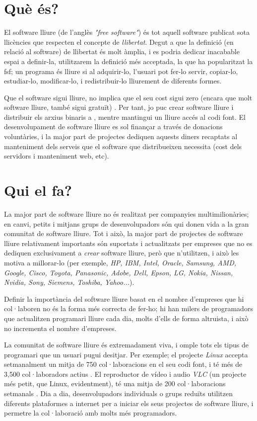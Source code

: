 \section{Què és?}

El software lliure (de l'anglès \emph{"free software"}) és tot aquell software publicat
sota llicències que respecten el concepte de \emph{llibertat}. Degut a que la definició
(en relació al software) de llibertat és molt àmplia, i es podria dedicar inacabable espai
a definir-la, utilitzarem la definició més acceptada, la que ha popularitzat la \ac{fsf}; un programa és lliure si al adquirir-lo, l'usuari pot fer-lo servir,
copiar-lo, estudiar-lo, modificar-lo, i redistribuir-lo lliurement de diferents formes. \cite{wikifree}

Que el software sigui lliure, no implica que el seu cost sigui zero (encara que molt
software lliure, també sigui gratuït) \cite{sellingfree}. Per tant, jo puc crear software lliure i distribuir els arxius
binaris a , mentre mantingui un lliure accés al codi font. El desenvolupament de software
lliure es sol finançar a través de donacions voluntàries, i la major part de projectes dediquen
aquests diners recaptats al manteniment dels serveis que el software que distribueixen necessita
(cost dels servidors i manteniment web, etc).

\section{Qui el fa?}

La major part de software lliure no és realitzat per companyies multimilionàries; en canvi,
petits i mitjans grups de desenvolupadors són qui donen vida a la gran comunitat de software lliure.
Tot i això, la major part de projectes de software lliure relativament importants
són suportats i actualitzats per empreses que no es dediquen exclusivament a \emph{crear}
software lliure, però que n'utilitzen, i això les motiva a millorar-lo (per exemple, \emph{HP, IBM, Intel, Oracle, Samsung, AMD, Google, Cisco, Toyota, Panasonic, Adobe, Dell, Epson, LG, Nokia, Nissan, Nvidia, Sony, Siemens, Toshiba, Yahoo...}\cite{linuxmembers}).

Definir la importància del software lliure basat en el nombre d'empreses que hi col·laboren no és la forma més correcta de fer-ho; hi han milers de programadors que actualitzen programari lliure cada dia, molts d'ells de forma altruista, i això no incrementa el nombre d'empreses.

La comunitat de software lliure és extremadament viva, i omple tots els tipus de programari que un usuari pugui desitjar. Per exemple; el projecte \emph{Linux} accepta setmanalment un mitja de 750 col·laboracions en el seu codi font, i té més de 3,500 col·laboradors actius \cite{linuxgitrepo}. El reproductor de vídeo i audio \emph{VLC} (un projecte més petit, que Linux, evidentment), té una mitja de 200 col·laboracions setmanals \cite{vlcgitrepo}. Dia a dia, desenvolupadors individuals o grups reduïts utilitzen diferents plataformes a internet per a iniciar els seus projectes de software lliure, i permetre la col·laboració amb molts més programadors.

